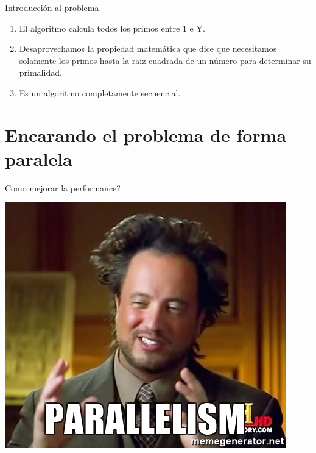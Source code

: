 \documentclass[compress]{beamer}
\begin{document}
\begin{frame}{Introducci\'on al problema}
  \begin{enumerate}
    \setlength\itemsep{1em}
    \item<1-> El algoritmo calcula todos los primos entre 1 e Y.
    \item<2-> Desaprovechamos la propiedad matemática que dice que necesitamos solamente los primos hasta la raiz cuadrada de un número para determinar su primalidad.
    \item<3-> Es un algoritmo completamente secuencial.
  \end{enumerate}
\end{frame}

\section{Encarando el problema de forma paralela}

\begin{frame}{Como mejorar la performance?}
  \begin{center}
    \includegraphics[scale=0.75]{imagenes/parallelism.jpg}
  \end{center}
\end{frame}
\end{document}
